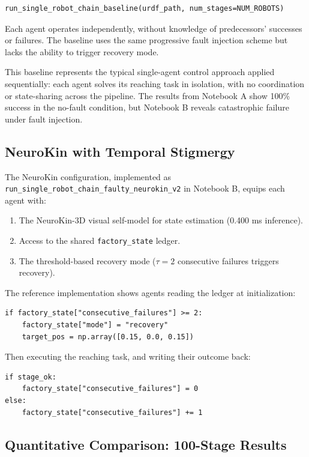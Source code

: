 \documentclass[12pt,a4paper,oneside]{report}
\begin{document}
\begin{verbatim}
run_single_robot_chain_baseline(urdf_path, num_stages=NUM_ROBOTS)
\end{verbatim}

Each agent operates independently, without knowledge of predecessors' successes or failures. The baseline uses the same progressive fault injection scheme but lacks the ability to trigger recovery mode.

This baseline represents the typical single-agent control approach applied sequentially: each agent solves its reaching task in isolation, with no coordination or state-sharing across the pipeline. The results from Notebook A show 100\% success in the no-fault condition, but Notebook B reveals catastrophic failure under fault injection.

\subsection{NeuroKin with Temporal Stigmergy}

The NeuroKin configuration, implemented as \texttt{run\_single\_robot\_chain\_faulty\_neurokin\_v2} in Notebook B, equips each agent with:

\begin{enumerate}
    \item The NeuroKin-3D visual self-model for state estimation (0.400 ms inference).
    \item Access to the shared \texttt{factory\_state} ledger.
    \item The threshold-based recovery mode ($\tau = 2$ consecutive failures triggers recovery).
\end{enumerate}

The reference implementation shows agents reading the ledger at initialization:

\begin{verbatim}
if factory_state["consecutive_failures"] >= 2:
    factory_state["mode"] = "recovery"
    target_pos = np.array([0.15, 0.0, 0.15])
\end{verbatim}

Then executing the reaching task, and writing their outcome back:

\begin{verbatim}
if stage_ok:
    factory_state["consecutive_failures"] = 0
else:
    factory_state["consecutive_failures"] += 1
\end{verbatim}

\subsection{Quantitative Comparison: 100-Stage Results}
\end{document}
